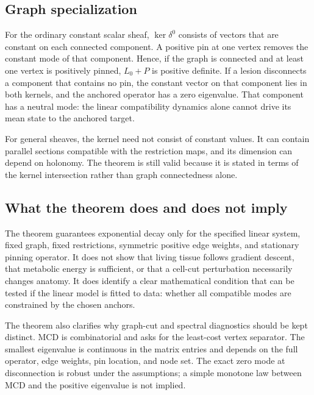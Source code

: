 \documentclass[12pt,a4paper]{article}
\begin{document}
\subsection{Graph specialization}
For the ordinary constant scalar sheaf, \(\ker\delta^0\) consists of vectors that are constant on each connected component. A positive pin at one vertex removes the constant mode of that component. Hence, if the graph is connected and at least one vertex is positively pinned, \(L_0+P\) is positive definite. If a lesion disconnects a component that contains no pin, the constant vector on that component lies in both kernels, and the anchored operator has a zero eigenvalue. That component has a neutral mode: the linear compatibility dynamics alone cannot drive its mean state to the anchored target.

For general sheaves, the kernel need not consist of constant values. It can contain parallel sections compatible with the restriction maps, and its dimension can depend on holonomy. The theorem is still valid because it is stated in terms of the kernel intersection rather than graph connectedness alone.

\subsection{What the theorem does and does not imply}
The theorem guarantees exponential decay only for the specified linear system, fixed graph, fixed restrictions, symmetric positive edge weights, and stationary pinning operator. It does not show that living tissue follows gradient descent, that metabolic energy is sufficient, or that a cell-cut perturbation necessarily changes anatomy. It does identify a clear mathematical condition that can be tested if the linear model is fitted to data: whether all compatible modes are constrained by the chosen anchors.

The theorem also clarifies why graph-cut and spectral diagnostics should be kept distinct. MCD is combinatorial and asks for the least-cost vertex separator. The smallest eigenvalue is continuous in the matrix entries and depends on the full operator, edge weights, pin location, and node set. The exact zero mode at disconnection is robust under the assumptions; a simple monotone law between MCD and the positive eigenvalue is not implied.
\end{document}
